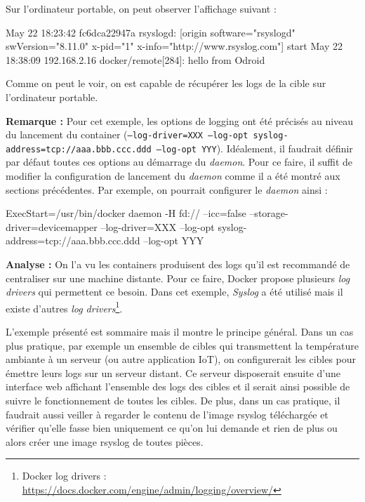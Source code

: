 \documentclass[11pt,a4paper,oneside]{report}
\newcommand{\code}[1]{\texttt{#1}}
\begin{document}
Sur l'ordinateur portable, on peut observer l'affichage suivant :
\begin{bashcode}
May 22 18:23:42 fc6dca22947a rsyslogd: [origin software="rsyslogd" swVersion="8.11.0" x-pid="1" x-info="http://www.rsyslog.com"] start
May 22 18:38:09 192.168.2.16 docker/remote[284]: hello from Odroid
\end{bashcode}

Comme on peut le voir, on est capable de récupérer les logs de la cible sur l'ordinateur portable.

\textbf{Remarque : } Pour cet exemple, les options de logging ont été précisés au niveau du lancement du container (\code{--log-driver=XXX --log-opt syslog-address=tcp://aaa.bbb.ccc.ddd --log-opt YYY}). Idéalement, il faudrait définir par défaut toutes ces options au démarrage du \textit{daemon}. Pour ce faire, il suffit de modifier la configuration de lancement du \textit{daemon} comme il a été montré aux sections précédentes. Par exemple, on pourrait configurer le \textit{daemon} ainsi :

\begin{bashcode}
ExecStart=/usr/bin/docker daemon -H fd:// --icc=false --storage-driver=devicemapper --log-driver=XXX --log-opt syslog-address=tcp://aaa.bbb.ccc.ddd --log-opt YYY
\end{bashcode}

\textbf{Analyse : } On l'a vu les containers produisent des logs qu'il est recommandé de centraliser sur une machine distante. Pour ce faire, Docker propose plusieurs \textit{log drivers} qui permettent ce besoin. Dans cet exemple, \textit{Syslog} a été utilisé mais il existe d'autres \textit{log drivers}\footnote{Docker log drivers : \url{https://docs.docker.com/engine/admin/logging/overview/}}.

L'exemple présenté est sommaire mais il montre le principe général. Dans un cas plus pratique, par exemple un ensemble de cibles qui transmettent la température ambiante à un serveur (ou autre application IoT), on configurerait les cibles pour émettre leurs logs sur un serveur distant. Ce serveur disposerait ensuite d'une interface web affichant l'ensemble des logs des cibles et il serait ainsi possible de suivre le fonctionnement de toutes les cibles. De plus, dans un cas pratique, il faudrait aussi veiller à regarder le contenu de l'image rsyslog téléchargée et vérifier qu'elle fasse bien uniquement ce qu'on lui demande et rien de plus ou alors créer une image rsyslog de toutes pièces.
\end{document}
